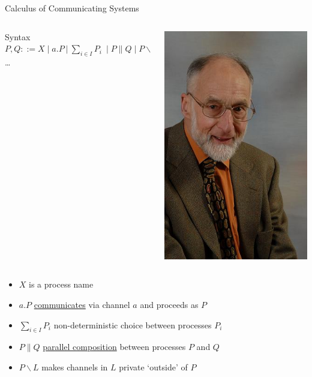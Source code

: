 \documentclass{beamer}
\begin{document}
\begin{frame}{Calculus of Communicating Systems}

  \begin{minipage}[0.3\textheight]{\textwidth}
  \begin{columns}[c]
  \begin{column}{0.8\textwidth}
    \begin{block}{Syntax}
      $P,Q ::= X \mid a . P\ |\ \sum_{ i \in I} P_i \ \mid P \parallel Q 
      \mid P \backslash L$ \mid \dots
    \end{block}
  \end{column}
  \begin{column}{0.23\textwidth}
    \includegraphics[scale=0.25]{images/Milner.jpg}
  \end{column}
  \end{columns}
  \end{minipage}
  \begin{itemize}
  \item $X$ is a process name
  \item $a. P$ \underline{communicates} via channel $a$ and proceeds as $P$
  \item $\sum_{ i \in I} P_i$ non-deterministic choice between processes $P_i$
  \item $P \parallel Q$ \underline{parallel composition} 
          between processes $P$ and $Q$
  \item $P \backslash L$ makes channels in $L$ private `outside' of $P$
  \end{itemize}
\end{frame}
\end{document}

